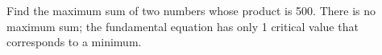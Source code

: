 {Find the maximum sum of two numbers whose product is 500.
}
{There is no maximum sum; the fundamental equation has only 1 critical value that corresponds to a minimum.
}

